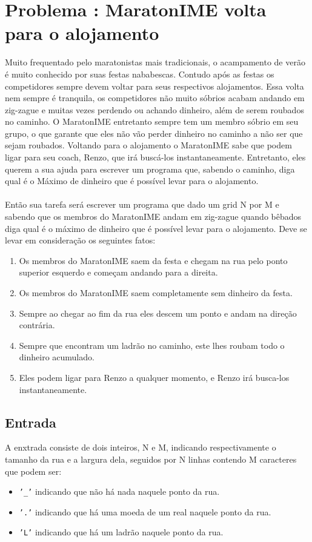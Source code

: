 \section*{Problema \proxLetra: MaratonIME volta para o alojamento}

Muito frequentado pelo maratonistas mais tradicionais, o acampamento de verão é muito conhecido por suas festas nababescas. Contudo após as festas os competidores sempre devem voltar para seus respectivos alojamentos. Essa volta nem sempre é tranquila, os competidores não muito sóbrios acabam andando em zig-zague e muitas vezes perdendo ou achando dinheiro, além de serem roubados no caminho. O MaratonIME entretanto sempre tem um membro sóbrio em seu grupo, o que garante que eles não vão perder dinheiro no caminho a não ser que sejam roubados. Voltando para o alojamento o MaratonIME sabe que podem ligar para seu coach, Renzo, que irá buscá-los instantaneamente. Entretanto, eles querem a sua ajuda para escrever um programa que, sabendo o caminho, diga qual é o Máximo de dinheiro que é possível levar para o alojamento.\\
\\
Então sua tarefa será escrever um programa que dado um grid N por M e sabendo que os membros do MaratonIME andam em zig-zague quando bêbados diga qual é o máximo de dinheiro que é possível levar para o alojamento. Deve se levar em consideração os seguintes fatos:\\
\begin{enumerate}
    \item Os membros do MaratonIME saem da festa e chegam na rua pelo ponto superior esquerdo e começam andando para a direita.
    \item Os membros do MaratonIME saem completamente sem dinheiro da festa.
    \item Sempre ao chegar ao fim da rua eles descem um ponto e andam na direção contrária.
    \item Sempre que encontram um ladrão no caminho, este lhes roubam todo o dinheiro acumulado.
    \item Eles podem ligar para Renzo a qualquer momento, e Renzo irá busca-los instantaneamente.
\end{enumerate}
\subsection*{Entrada}

A enxtrada consiste de dois inteiros, N e M, indicando respectivamente o tamanho da rua e a largura dela, seguidos por N linhas contendo M caracteres que podem ser:\\
\begin{itemize}
    \item \texttt{'\_'} indicando que não há nada naquele ponto da rua.
    \item \texttt{'.'} indicando que há uma moeda de um real naquele ponto da rua.
    \item \texttt{'L'} indicando que há um ladrão naquele ponto da rua.
\end{itemize}

